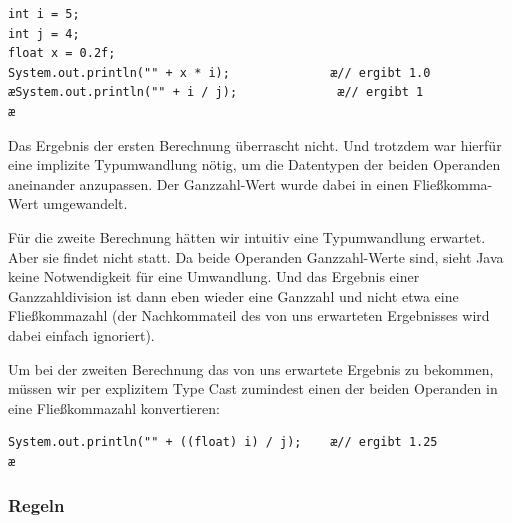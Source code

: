 \begin{lstlisting}
int i = 5;
int j = 4;
float x = 0.2f;
System.out.println("" + x * i);              æ// ergibt 1.0
æSystem.out.println("" + i / j);              æ// ergibt 1
æ\end{lstlisting}

Das Ergebnis der ersten Berechnung überrascht nicht. Und trotzdem war hierfür
eine implizite Typumwandlung nötig, um die Datentypen der beiden Operanden
aneinander anzupassen. Der Ganzzahl-Wert wurde dabei in einen Fließkomma-Wert
umgewandelt.

Für die zweite Berechnung hätten wir intuitiv eine Typumwandlung erwartet. Aber
sie findet nicht statt. Da beide Operanden Ganzzahl-Werte sind, sieht Java
keine Notwendigkeit für eine Umwandlung. Und das Ergebnis einer
Ganzzahldivision ist dann eben wieder eine Ganzzahl und nicht etwa eine
Fließkommazahl (der Nachkommateil des von uns erwarteten Ergebnisses wird dabei
einfach ignoriert).

Um bei der zweiten Berechnung das von uns erwartete Ergebnis zu bekommen, müssen
wir per explizitem Type Cast zumindest einen der beiden Operanden in eine
Fließkommazahl konvertieren:

\begin{lstlisting}
System.out.println("" + ((float) i) / j);    æ// ergibt 1.25
æ\end{lstlisting}

\subsubsection{Regeln}

